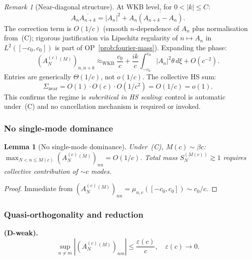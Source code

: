 \documentclass[12pt,a4paper]{amsart}
\newtheorem{lemma}[theorem]{Lemma}
\theoremstyle{definition}
\theoremstyle{remark}
\newtheorem{remark}[theorem]{Remark}
\newcommand{\Ac}{A_N^{(c)}}
\begin{document}
\begin{remark}[Near-diagonal structure]
\label{rem:near-diagonal-structure}
At WKB level, for $0<|k|\le C$:
\begin{equation}\label{eq:near-diag-amplitude}
  A_n\overline{A_{n+k}}
  = |A_n|^2
  + A_n\overline{(A_{n+k}-A_n)}.
\end{equation}
The correction term is $O(1/c)$
(smooth $n$-dependence of $A_n$
plus normalisation from~(C);
rigorous justification via Lipschitz
regularity of $n\mapsto A_n$ in
$L^2([-c_0,c_0])$ is part of
OP~\ref{prob:fourier-mass}).
Expanding the phase:
\begin{equation}\label{eq:near-diag-expansion}
  (\Ac^{(M)})_{n,n+k}
  \approx_{\mathrm{WKB}}
  \frac{c_0}{c}
  + \frac{ik}{c}
    \int_{-c_0}^{c_0}
    |A_n|^2\theta\,d\xi
  + O(c^{-2}).
\end{equation}
Entries are generically $\Theta(1/c)$,
not $o(1/c)$.
The collective HS sum:
\[
  \Sigma_{\mathrm{near}}
  = O(1)\cdot O(c)\cdot O(1/c^2)
  = O(1/c) = o(1).
\]
This confirms the regime is
\emph{subcritical in HS scaling}:
control is automatic under~(C)
and no cancellation mechanism
is required or invoked.
\end{remark}

\subsubsection*{No single-mode dominance}

\begin{lemma}[No single-mode dominance]
\label{lem:no-single-mode}
Under~(C), $M(c)\sim\beta c$:
$\max_{N<n\le M(c)}(\Ac^{(M)})_{nn}
=O(1/c)$.
Total mass $S_N^{(M(c))}\gtrsim 1$
requires collective contribution
of $\sim c$ modes.
\end{lemma}
\begin{proof}
Immediate from
$(\Ac^{(M)})_{nn}
=\mu_{n,c}([-c_0,c_0])\sim c_0/c$.
\end{proof}

\subsubsection*{Quasi-orthogonality
  and reduction}

\noindent\textbf{(D-weak).}
\begin{equation}\label{eq:quasi-orth}
  \sup_{n\ne m}
  \left|(\Ac^{(M)})_{nm}\right|
  \le \frac{\varepsilon(c)}{c},
  \quad\varepsilon(c)\to 0.
\end{equation}
\end{document}
